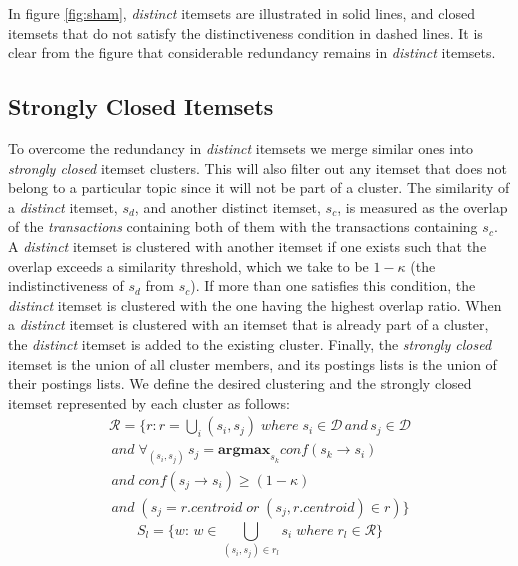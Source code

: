 \documentclass{sig-alternate}
\begin{document}
In figure \ref{fig:sham}, \emph{distinct} itemsets are illustrated in solid
lines, and closed itemsets that do not satisfy the distinctiveness condition in dashed lines.
It is clear from the figure that considerable redundancy remains in
\emph{distinct} itemsets.

\subsection{Strongly Closed Itemsets}
To overcome the redundancy in \emph{distinct} itemsets 
we merge similar ones
into \emph{strongly closed} itemset clusters.
This will also filter out any itemset 
that does not belong to a particular topic
since it will not be part of a cluster.
The similarity of a \emph{distinct} itemset,
$s_d$, and another distinct itemset, $s_c$,
is measured as the overlap of the \emph{transactions} containing both of them
with the transactions containing $s_c$. 
A \emph{distinct} itemset is clustered with another itemset if one exists
such that the overlap exceeds a similarity threshold,
which we take to be $1-\kappa$ (the indistinctiveness of $s_d$ from $s_c$).
If more than one satisfies this condition,
the  \emph{distinct} itemset is clustered with the 
one having the highest overlap ratio.
When  a \emph{distinct} itemset is clustered with an itemset that is already
part of a cluster, the \emph{distinct} itemset is added to the existing cluster.
Finally, the \emph{strongly closed} itemset is the union of all cluster members,
and its postings lists is the union of their postings lists.
We define the  desired clustering  and the strongly closed itemset
represented by each cluster as follows:
\begin{align*}\label{eq:strongClosedFormal}
\mathcal{R} = \{r: r = \bigcup_i{(s_i, s_j)}\; where\; s_i \in \mathcal{D} \, and \, s_j \in \mathcal{D} 
\\\,and\; \forall_{(s_i,s_j)} \, s_j = \textbf{argmax}_{s_k} conf(s_k \rightarrow s_i) \\\,and \;conf(s_j \rightarrow s_i) \ge (1-\kappa)
\\\, and\;( s_j = r.centroid\; or \; (s_j, r.centroid) \in r )\}
\end{align*}
\begin{equation}S_l = \{w:\, w \in \bigcup_{(s_i, s_j) \in r_l}{s_i} \; where \; r_l \in \mathcal{R}\}\end{equation}
\end{document}
